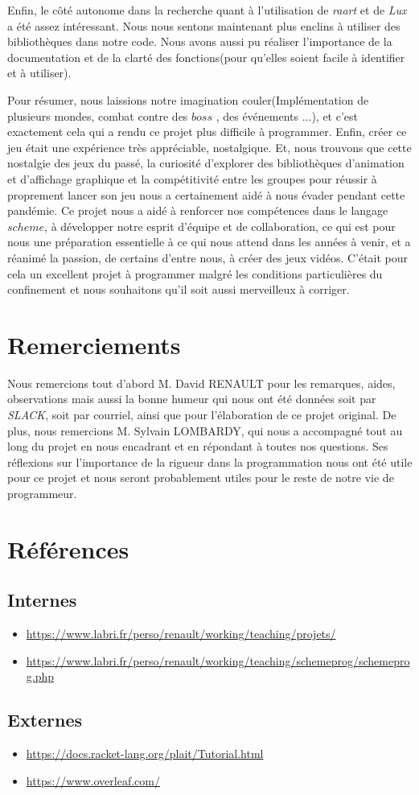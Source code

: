 \documentclass{article}
\begin{document}
Enfin, le côté autonome dans la recherche quant à l'utilisation de \textit{raart} et de \textit{Lux} a été assez intéressant. Nous nous sentons maintenant plus enclins à utiliser des bibliothèques dans notre code. Nous avons aussi pu réaliser l'importance de la documentation et de la clarté des fonctions(pour qu'elles soient facile à identifier et à utiliser).

Pour résumer, nous laissions notre imagination couler(Implémentation de plusieurs mondes, combat contre des $boss$ , des événements ...), et c'est exactement cela qui a rendu ce projet plus difficile à programmer. Enfin, créer ce jeu était une expérience très appréciable, nostalgique. Et, nous trouvons que cette nostalgie des jeux du passé, la curiosité d'explorer des bibliothèques d'animation et d'affichage graphique et la compétitivité entre les groupes pour réussir à proprement lancer son jeu nous a certainement aidé à nous évader pendant cette pandémie. Ce projet nous a aidé à renforcer nos compétences dans le langage $scheme$, à développer notre esprit d’équipe et de collaboration, ce qui est pour nous une préparation essentielle à ce qui nous attend dans les années à venir, et a réanimé la passion, de certains d'entre nous, à créer des jeux vidéos. C'était pour cela un excellent projet à programmer malgré les conditions particulières du confinement et nous souhaitons qu'il soit aussi merveilleux à corriger.

\section{Remerciements}
Nous remercions tout d'abord M. David RENAULT pour les remarques, aides,  observations mais aussi la bonne humeur qui nous ont été données soit par \textit{SLACK}, soit par courriel, ainsi que pour l'élaboration de ce projet original. De plus, nous remercions M. Sylvain LOMBARDY, qui nous a accompagné tout au long du projet en nous encadrant et en répondant à toutes nos questions. Ses réflexions sur l'importance de la rigueur dans la programmation nous ont été utile pour ce projet et nous seront probablement utiles pour le reste de notre vie de programmeur. 

\section{Références}
\subsection{Internes}
\begin{itemize}
    \item \url{https://www.labri.fr/perso/renault/working/teaching/projets/}
    \item \url{https://www.labri.fr/perso/renault/working/teaching/schemeprog/schemeprog.php}
\end{itemize}
\subsection{Externes}
\begin{itemize}
    \item \url{https://docs.racket-lang.org/plait/Tutorial.html}
    \item \url{https://www.overleaf.com/}
\end{itemize}
\end{document}
